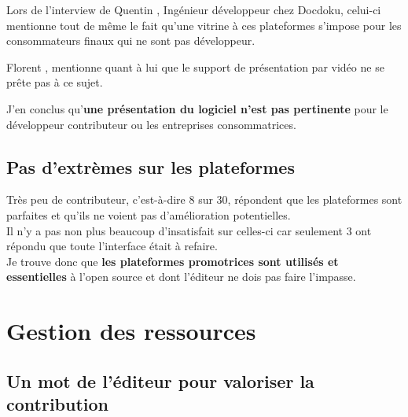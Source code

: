 			Lors de l'interview de Quentin , Ingénieur développeur chez Docdoku, celui-ci mentionne tout de même le fait qu'une vitrine à ces plateformes s'impose pour les consommateurs finaux qui ne sont pas développeur.

			\begin{center}
				\textit{
				}
			\end{center}

			Florent , mentionne quant à lui que le support de présentation par vidéo ne se prête pas à ce sujet.

			\begin{center}
				\textit{
				}
			\end{center}

			J'en conclus qu'\textbf{une présentation du logiciel n'est pas pertinente} pour le développeur contributeur ou les entreprises consommatrices.

		\subsection{Pas d'extrèmes sur les plateformes}

			Très peu de contributeur, c'est-à-dire 8 sur 30, répondent que les plateformes sont parfaites et qu'ils ne voient pas d'amélioration potentielles.\\

			Il n'y a pas non plus beaucoup d'insatisfait sur celles-ci car seulement 3 ont répondu que toute l'interface était à refaire.\\

			Je trouve donc que \textbf{les plateformes promotrices sont utilisés et essentielles} à l'open source et dont l'éditeur ne dois pas faire l'impasse.

	\section{Gestion des ressources}

		\subsection{Un mot de l'éditeur pour valoriser la contribution}

